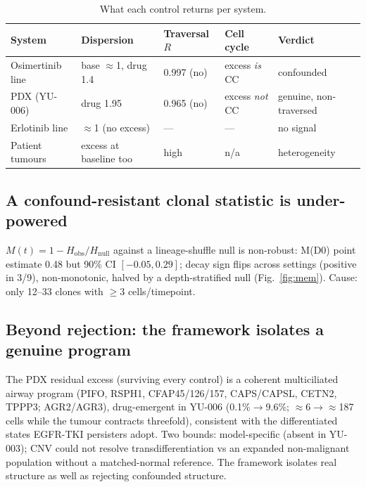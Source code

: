 \documentclass[11pt,a4paper]{article}
\begin{document}
\begin{table}[h]\centering\small
\caption{What each control returns per system.}\label{tab:summary}
\begin{tabular}{@{}lllll@{}}\toprule
System & Dispersion & Traversal $R$ & Cell cycle & Verdict \\\midrule
Osimertinib line & base $\approx$1, drug 1.4 & 0.997 (no) & excess \emph{is} CC & confounded \\
PDX (YU-006) & drug 1.95 & 0.965 (no) & excess \emph{not} CC & genuine, non-traversed \\
Erlotinib line & $\approx$1 (no excess) & --- & --- & no signal \\
Patient tumours & excess at baseline too & high & n/a & heterogeneity \\\bottomrule
\end{tabular}
\end{table}

\subsection*{A confound-resistant clonal statistic is under-powered}
$M(t)=1-H_{\mathrm{obs}}/H_{\mathrm{null}}$ against a lineage-shuffle null is non-robust: M(D0) point
estimate 0.48 but 90\% CI $[-0.05,0.29]$; decay sign flips across settings (positive in 3/9),
non-monotonic, halved by a depth-stratified null (Fig.~\ref{fig:mem}). Cause: only 12--33 clones
with $\ge3$ cells/timepoint.

\subsection*{Beyond rejection: the framework isolates a genuine program}
The PDX residual excess (surviving every control) is a coherent multiciliated airway program (PIFO,
RSPH1, CFAP45/126/157, CAPS/CAPSL, CETN2, TPPP3; AGR2/AGR3), drug-emergent in YU-006 (0.1\%$\to$9.6\%;
$\approx$6$\to$$\approx$187 cells while the tumour contracts threefold), consistent with the
differentiated states EGFR-TKI persisters adopt. Two bounds: model-specific (absent in YU-003);
CNV could not resolve transdifferentiation vs an expanded non-malignant population without a
matched-normal reference. The framework isolates real structure as well as rejecting confounded
structure.
\end{document}
